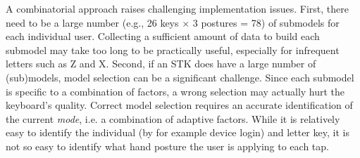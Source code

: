\documentclass{sigchi}
\begin{document}
A combinatorial approach raises challenging implementation issues. First, there need to be a large number (e.g., 26 keys $\times$ 3 postures = 78) of submodels for each individual user. Collecting a sufficient amount of data to build each submodel may take too long to be practically useful, especially for infrequent letters such as Z and X. Second, if an STK does have a large number of (sub)models, model selection can be a significant challenge.  Since each submodel is specific to a combination of factors, a wrong selection may actually hurt the keyboard’s quality. Correct model selection requires an accurate identification of the current \textit{mode}, i.e. a combination of adaptive factors. While it is relatively easy to identify the individual (by for example device login) and letter key, it is not so easy to identify what hand posture the user is applying to each tap. 
\end{document}

